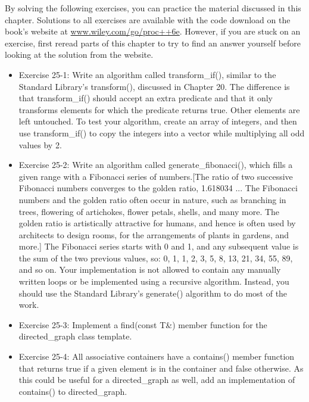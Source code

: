 By solving the following exercises, you can practice the material discussed in this chapter. Solutions to all exercises are available with the code download on the book’s website at \url{www.wiley.com/go/proc++6e}. However, if you are stuck on an exercise, first reread parts of this chapter to try to find an answer yourself before looking at the solution from the website.

\begin{itemize}
\item
Exercise 25-1: Write an algorithm called transform\_if(), similar to the Standard Library’s transform(), discussed in Chapter 20. The difference is that transform\_if() should accept an extra predicate and that it only transforms elements for which the predicate returns true. Other elements are left untouched. To test your algorithm, create an array of integers, and then use transform\_if() to copy the integers into a vector while multiplying all odd values by 2.

\item
Exercise 25-2: Write an algorithm called generate\_fibonacci(), which fills a given range with a Fibonacci series of numbers.[The ratio of two successive Fibonacci numbers converges to the golden ratio, 1.618034 ... The Fibonacci numbers and the golden ratio often occur in nature, such as branching in trees, flowering of artichokes, flower petals, shells, and many more. The golden ratio is artistically attractive for humans, and hence is often used by architects to design rooms, for the arrangements of plants in gardens, and more.] The Fibonacci series starts with 0 and 1, and any subsequent value is the sum of the two previous values, so: 0, 1, 1, 2, 3, 5, 8, 13, 21, 34, 55, 89, and so on. Your implementation is not allowed to contain any manually written loops or be implemented using a recursive algorithm. Instead, you should use the Standard Library’s generate() algorithm to do most of the work.

\item
Exercise 25-3: Implement a find(const T\&) member function for the directed\_graph class template.

\item
Exercise 25-4: All associative containers have a contains() member function that returns true if a given element is in the container and false otherwise. As this could be useful for a directed\_graph as well, add an implementation of contains() to directed\_graph.
\end{itemize}











